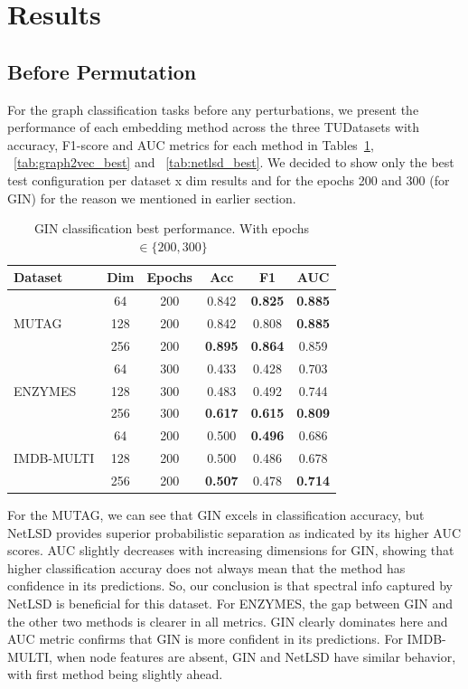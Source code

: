 \section{Results}
\subsection{Before Permutation}
 
For the graph classification tasks before any perturbations, we present the performance of each 
embedding method across the three TUDatasets with accuracy, F1-score and AUC metrics for each method in Tables~\ref{tab:gin_best}, ~\ref{tab:graph2vec_best} and ~\ref{tab:netlsd_best}. 
We decided to show only the best test configuration per dataset x dim results 
and for the epochs 200 and 300 (for GIN) for the reason we mentioned in earlier section.



\begin{table}
\centering
\begin{tabular}{l c c c c c}
\hline
\textbf{Dataset} & \textbf{Dim} & \textbf{Epochs} & \textbf{Acc} & \textbf{F1} & \textbf{AUC} \\
\hline
     & 64  & 200 & 0.842 & \textbf{0.825} & \textbf{0.885} \\
MUTAG      & 128 & 200 & 0.842 & 0.808 & \textbf{0.885} \\
      & 256 & 200 & \textbf{0.895} & \textbf{0.864} & 0.859 \\
\hline
    & 64  & 300 & 0.433 & 0.428 & 0.703 \\
ENZYMES    & 128 & 300 & 0.483 & 0.492 & 0.744 \\
  & 256 & 300 & \textbf{0.617} & \textbf{0.615} & \textbf{0.809} \\
\hline
 & 64  & 200 & 0.500 & \textbf{0.496} & 0.686 \\
IMDB-MULTI & 128 & 200 & 0.500 & 0.486 & 0.678 \\
 & 256 & 200 & \textbf{0.507} & 0.478 & \textbf{0.714} \\
\hline
\end{tabular}
\caption{GIN classification best performance. With epochs $\in \{200,300\}$}
\label{tab:gin_best}
\end{table}



For the MUTAG, we can see that GIN excels in classification accuracy, but NetLSD provides 
superior probabilistic separation as indicated by its higher AUC scores. 
AUC slightly decreases with increasing dimensions for GIN, showing that 
higher classification accuray does not always mean that the method 
has confidence in its predictions. 
So, our conclusion is that spectral info captured by NetLSD is beneficial for this dataset.
For ENZYMES, the gap between GIN and the other two methods is clearer in all metrics.
GIN clearly dominates here and AUC metric confirms that GIN is more confident in its predictions.
For IMDB-MULTI, when node features are absent, GIN and NetLSD have similar behavior, with first method being slightly ahead.


